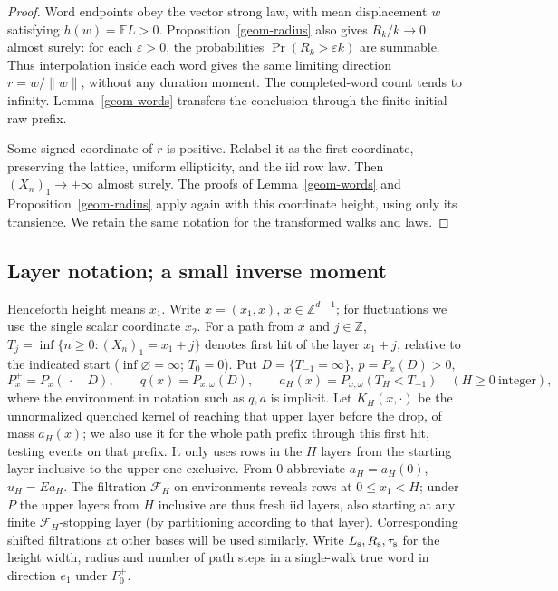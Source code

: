 \begin{proof}
Word endpoints obey the vector strong law, with mean displacement
\(w\) satisfying \(h(w)=\mathbb E L>0\). Proposition~\ref{geom-radius}
also gives \(R_k/k\to0\) almost surely: for each \(\varepsilon>0\),
the probabilities \(\Pr(R_k>\varepsilon k)\) are summable. Thus
interpolation inside each word gives the same limiting direction
\(r=w/\|w\|\), without any duration moment. The completed-word count
tends to infinity. Lemma~\ref{geom-words} transfers the conclusion
through the finite initial raw prefix.

Some signed coordinate of \(r\) is positive. Relabel it as the first
coordinate, preserving the lattice, uniform ellipticity, and the iid
row law. Then \((X_n)_1\to+\infty\) almost surely. The proofs of
Lemma~\ref{geom-words} and Proposition~\ref{geom-radius} apply again
with this coordinate height, using only its transience. We retain the
same notation for the transformed walks and laws.
\end{proof}

\subsection{Layer notation; a small inverse moment}

Henceforth height means \(x_1\). Write \(x=(x_1,\underline x)\), \(\underline x\in\mathbb Z^{d-1}\); for fluctuations we use the single scalar coordinate \(x_2\). For a path from \(x\) and \(j\in\mathbb Z\), \(T_j=\inf\{n\ge0:(X_n)_1=x_1+j\}\) denotes first hit of the layer \(x_1+j\), relative to the indicated start (\(\inf\varnothing=\infty\); \(T_0=0\)). Put \(D=\{T_{-1}=\infty\}\), \(p=P_x(D)>0\),
\[
P_x^+=P_x(\,\cdot\,\mid D),\qquad q(x)=P_{x,\omega}(D),\qquad
a_H(x)=P_{x,\omega}(T_H<T_{-1})\quad(H\ge0\ \text{integer}),
\]
where the environment in notation such as \(q,a\) is implicit. Let \(K_H(x,\cdot)\) be the unnormalized quenched kernel of reaching that upper layer before the drop, of mass \(a_H(x)\); we also use it for the whole path prefix through this first hit, testing events on that prefix. It only uses rows in the \(H\) layers from the starting layer inclusive to the upper one exclusive. From 0 abbreviate \(a_H=a_H(0)\), \(u_H=E a_H\). The filtration \(\mathcal F_H\) on environments reveals rows at \(0\le x_1<H\); under \(P\) the upper layers from \(H\) inclusive are thus fresh iid layers, also starting at any finite \(\mathcal F_H\)-stopping layer (by partitioning according to that layer). Corresponding shifted filtrations at other bases will be used similarly. Write \(L_{\rm s},R_{\rm s},\tau_{\rm s}\) for the height width, radius and number of path steps in a single-walk true word in direction \(e_1\) under \(P_0^+\).

